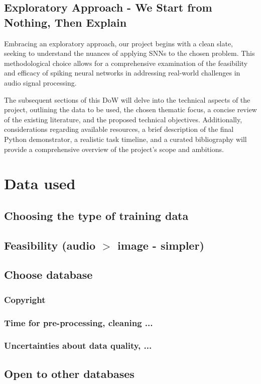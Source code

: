 \documentclass{article}
\begin{document}
\subsection{Exploratory Approach - We Start from Nothing, Then Explain}

Embracing an exploratory approach, our project begins with a clean slate, seeking to understand the nuances of applying SNNs to the chosen problem. This methodological choice allows for a comprehensive examination of the feasibility and efficacy of spiking neural networks in addressing real-world challenges in audio signal processing.

The subsequent sections of this DoW will delve into the technical aspects of the project, outlining the data to be used, the chosen thematic focus, a concise review of the existing literature, and the proposed technical objectives. Additionally, considerations regarding available resources, a brief description of the final Python demonstrator, a realistic task timeline, and a curated bibliography will provide a comprehensive overview of the project's scope and ambitions.

\section{Data used}
\subsection{Choosing the type of training data}
\subsection{Feasibility (audio $>$ image - simpler)}
\subsection{Choose database}
\subsubsection{Copyright}
\subsubsection{Time for pre-processing, cleaning ...}
\subsubsection{Uncertainties about data quality, ...}
\subsection{Open to other databases}
\end{document}
